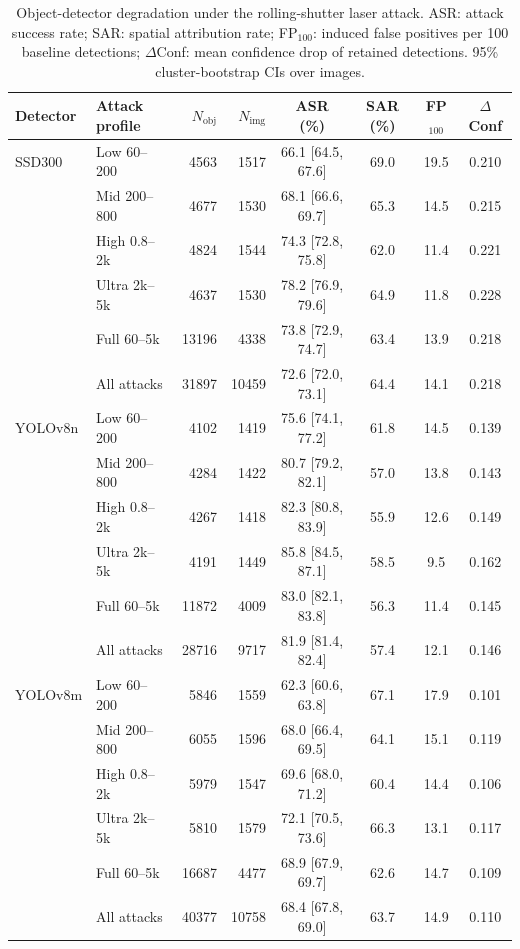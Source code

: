 \begin{table}[t]
\centering
\caption{Object-detector degradation under the rolling-shutter laser attack. ASR: attack success rate; SAR: spatial attribution rate; FP$_{100}$: induced false positives per 100 baseline detections; $\Delta$Conf: mean confidence drop of retained detections. 95\% cluster-bootstrap CIs over images.}
\label{tab:detector_degradation}
\footnotesize
\begin{tabular}{llrrcccc}
\toprule
Detector & Attack profile & $N_{\mathrm{obj}}$ & $N_{\mathrm{img}}$ & ASR (\%) & SAR (\%) & FP$_{100}$ & $\Delta$Conf \\
\midrule
SSD300 & Low 60--200 & 4563 & 1517 & 66.1 [64.5, 67.6] & 69.0 & 19.5 & 0.210 \\
 & Mid 200--800 & 4677 & 1530 & 68.1 [66.6, 69.7] & 65.3 & 14.5 & 0.215 \\
 & High 0.8--2k & 4824 & 1544 & 74.3 [72.8, 75.8] & 62.0 & 11.4 & 0.221 \\
 & Ultra 2k--5k & 4637 & 1530 & 78.2 [76.9, 79.6] & 64.9 & 11.8 & 0.228 \\
 & Full 60--5k & 13196 & 4338 & 73.8 [72.9, 74.7] & 63.4 & 13.9 & 0.218 \\
 & All attacks & 31897 & 10459 & 72.6 [72.0, 73.1] & 64.4 & 14.1 & 0.218 \\
\midrule
YOLOv8n & Low 60--200 & 4102 & 1419 & 75.6 [74.1, 77.2] & 61.8 & 14.5 & 0.139 \\
 & Mid 200--800 & 4284 & 1422 & 80.7 [79.2, 82.1] & 57.0 & 13.8 & 0.143 \\
 & High 0.8--2k & 4267 & 1418 & 82.3 [80.8, 83.9] & 55.9 & 12.6 & 0.149 \\
 & Ultra 2k--5k & 4191 & 1449 & 85.8 [84.5, 87.1] & 58.5 & 9.5 & 0.162 \\
 & Full 60--5k & 11872 & 4009 & 83.0 [82.1, 83.8] & 56.3 & 11.4 & 0.145 \\
 & All attacks & 28716 & 9717 & 81.9 [81.4, 82.4] & 57.4 & 12.1 & 0.146 \\
\midrule
YOLOv8m & Low 60--200 & 5846 & 1559 & 62.3 [60.6, 63.8] & 67.1 & 17.9 & 0.101 \\
 & Mid 200--800 & 6055 & 1596 & 68.0 [66.4, 69.5] & 64.1 & 15.1 & 0.119 \\
 & High 0.8--2k & 5979 & 1547 & 69.6 [68.0, 71.2] & 60.4 & 14.4 & 0.106 \\
 & Ultra 2k--5k & 5810 & 1579 & 72.1 [70.5, 73.6] & 66.3 & 13.1 & 0.117 \\
 & Full 60--5k & 16687 & 4477 & 68.9 [67.9, 69.7] & 62.6 & 14.7 & 0.109 \\
 & All attacks & 40377 & 10758 & 68.4 [67.8, 69.0] & 63.7 & 14.9 & 0.110 \\
\bottomrule
\end{tabular}
\end{table}